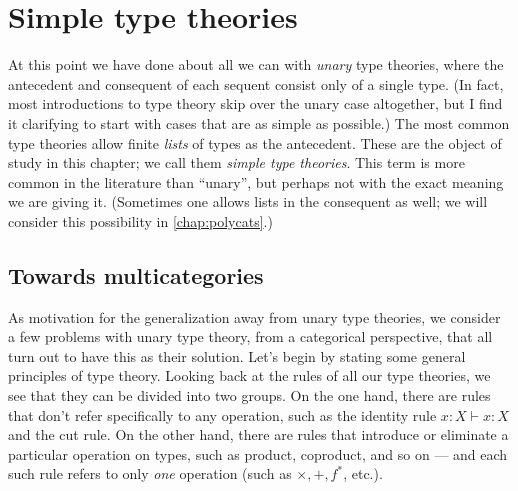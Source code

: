 \documentclass{book}
\let\types\vdash
\newcommand{\F}[1]{\mathfrak{F}_{#1}}
\begin{document}


\chapter{Simple type theories}
\label{chap:simple}

At this point we have done about all we can with \emph{unary} type theories, where the antecedent and consequent of each sequent consist only of a single type.
(In fact, most introductions to type theory skip over the unary case altogether, but I find it clarifying to start with cases that are as simple as possible.)
The most common type theories allow finite \emph{lists} of types as the antecedent.
These are the object of study in this chapter; we call them \emph{simple type theories}.
This term is more common in the literature than ``unary'', but perhaps not with the exact meaning we are giving it.
(Sometimes one allows lists in the consequent as well; we will consider this possibility in \cref{chap:polycats}.)

\section{Towards multicategories}
\label{sec:why-multicats}

As motivation for the generalization away from unary type theories, we consider a few problems with unary type theory, from a categorical perspective, that all turn out to have this as their solution.
Let's begin by stating some general principles of type theory.
Looking back at the rules of all our type theories, we see that they can be divided into two groups.
On the one hand, there are rules that don't refer specifically to any operation, such as the identity rule $x:X \types x:X$ and the cut rule.
On the other hand, there are rules that introduce or eliminate a particular operation on types, such as product, coproduct, and so on --- and each such rule refers to only \emph{one} operation  (such as $\times,+,f^*$, etc.).
\end{document}
